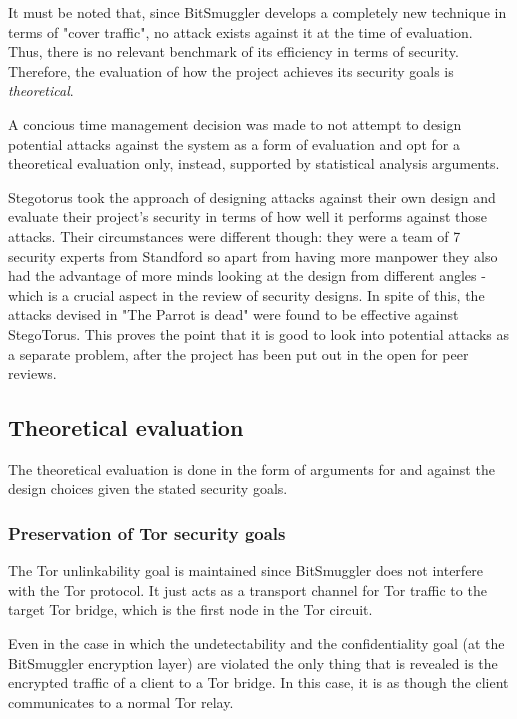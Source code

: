 \documentclass[11pt]{book} %
\newcommand{\projectName}{BitSmuggler }
\begin{document}
It must be noted that, since \projectName develops a completely new technique in terms of "cover traffic", no attack exists against it at the time of evaluation. Thus, there is no relevant benchmark of its efficiency in terms of security. Therefore, the evaluation of how the project achieves its security goals is \textit{theoretical}.

A concious time management decision was made to not attempt to design potential attacks against the system as a form of evaluation and opt for a theoretical evaluation only, instead, supported by statistical analysis arguments.

Stegotorus \citep*{stegotorus}took the approach of designing attacks against their own design and evaluate their project's security in terms of how well it performs against those attacks. Their circumstances were different though: they were a team of 7 security experts from Standford so apart from having more manpower they also had the advantage of more minds looking at the design from different angles - which is a crucial aspect in the review of security designs. In spite of this, the attacks devised in "The Parrot is dead" \citep*{deadParrot} were found to be effective against StegoTorus. This proves the point that it is good to look into potential attacks as a separate problem, after the project has been put out in the open for peer reviews.

\subsection{Theoretical evaluation}

The theoretical evaluation is done in the form of arguments for and against the design choices given the stated security goals.

\subsubsection{Preservation of Tor security goals}

The Tor unlinkability goal is maintained since \projectName does not interfere with the Tor protocol. It just acts as a transport channel for Tor traffic to the target Tor bridge, which is the first node in the Tor circuit.

Even in the case in which the undetectability and the confidentiality goal (at the \projectName encryption layer) are violated the only thing that is revealed is the encrypted traffic of a client to a Tor bridge. In this case, it is as though the client communicates to a normal Tor relay.
\end{document}
